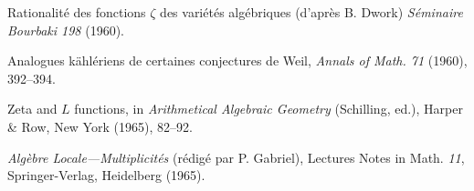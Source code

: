 {Rationalit\'e des fonctions $\zeta$ des vari\'et\'es alg\'ebriques (d'apr\`es B. Dwork) \emph{S\'eminaire Bourbaki 198} (1960).\par
\noindent\hangindent=25bp\hspace*{6bp}%
Analogues k\"ahl\'eriens de certaines conjectures de Weil, \emph{Annals of Math. 71} (1960), 392--394.\par
\noindent\hangindent=25bp\hspace*{6bp}%
Zeta and $L$ functions, in \emph{Arithmetical Algebraic Geometry} (Schilling, ed.), Harper \& Row, New York (1965), 82--92.\par
\noindent\hangindent=25bp\hspace*{6bp}%
\emph{Alg\`ebre Locale---Multiplicit\'es} (r\'edig\'e par P. Gabriel), Lectures Notes in Math. \emph{11}, Springer-Verlag, Heidelberg (1965).\par
}
